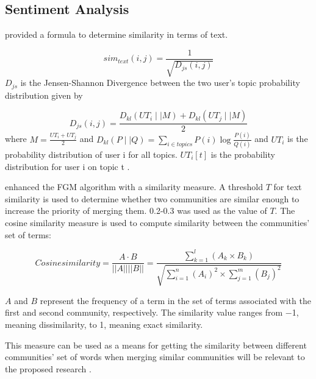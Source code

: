 \subsection{Sentiment Analysis}
\label{subsec:sentiana}


 provided a formula to determine similarity in terms of text. 


\begin{equation}
sim_{text}(i,j) = \frac{1}{\sqrt{D_{js}(i,j)}}
\end{equation}$D_{js}$ is the Jensen-Shannon Divergence between the two user’s topic probability distribution given by


\begin{equation}
D_{js}(i,j) = \frac{D_{kl}(UT_i \mid\mid M) + D_{kl}(UT_j \mid\mid M)}{2}
\end{equation}where $M = \frac{UT_i + UT_j}{2}$ and $D_{kl}(P \mid\mid Q) = \sum_{i \in topics} P(i) \log{\frac{P(i)}{Q(i)}}$ and $UT_i$ is the probability distribution of user i for all topics. $UT_i[t]$ is the probability distribution for user i on topic t \cite{Zhang:2012}.


 enhanced the FGM algorithm with a similarity measure. A threshold $T$ for text similarity is used to determine whether two communities are similar enough to increase the priority of merging them. 0.2-0.3 was used as the value of $T$. The cosine similarity measure is used to compute similarity between the communities' set of terms:


\begin{equation}
Cosine similarity = \frac {A \cdot B}{||A|| ||B||} = \frac {\sum_{k = 1}^{l}(A_k \times B_k)}{\sqrt{\sum_{i = 1}^{n} (A_i)^2 \times \sum_{j = 1}^{m} (B_j)^2}}
\end{equation}


$A$ and $B$ represent the frequency of a term in the set of terms associated with the first and second community, respectively. The similarity value ranges from −1, meaning dissimilarity, to 1, meaning exact similarity.


This measure can be used as a means for getting the similarity between different communities’ set of words when merging similar communities will be relevant to the proposed research \cite{Bakillah:2014}.


